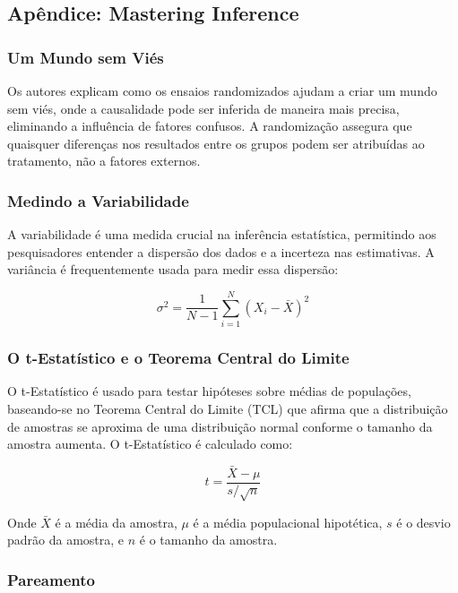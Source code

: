 \documentclass[a4paper,12pt]{article}[abntex2]
\begin{document}
\subsection*{Apêndice: Mastering Inference}

\subsubsection*{Um Mundo sem Viés}

Os autores explicam como os ensaios randomizados ajudam a criar um mundo sem viés, onde a causalidade pode ser inferida de maneira mais precisa, eliminando a influência de fatores confusos. A randomização assegura que quaisquer diferenças nos resultados entre os grupos podem ser atribuídas ao tratamento, não a fatores externos.

\subsubsection*{Medindo a Variabilidade}

A variabilidade é uma medida crucial na inferência estatística, permitindo aos pesquisadores entender a dispersão dos dados e a incerteza nas estimativas. A variância é frequentemente usada para medir essa dispersão:

\begin{equation}
    \sigma^2 = \frac{1}{N-1} \sum_{i=1}^{N} (X_i - \bar{X})^2
\end{equation}

\subsubsection*{O t-Estatístico e o Teorema Central do Limite}

O t-Estatístico é usado para testar hipóteses sobre médias de populações, baseando-se no Teorema Central do Limite (TCL) que afirma que a distribuição de amostras se aproxima de uma distribuição normal conforme o tamanho da amostra aumenta. O t-Estatístico é calculado como:

\begin{equation}
    t = \frac{\bar{X} - \mu}{s / \sqrt{n}}
\end{equation}

Onde \(\bar{X}\) é a média da amostra, \(\mu\) é a média populacional hipotética, \(s\) é o desvio padrão da amostra, e \(n\) é o tamanho da amostra.

\subsubsection*{Pareamento}
\end{document}
